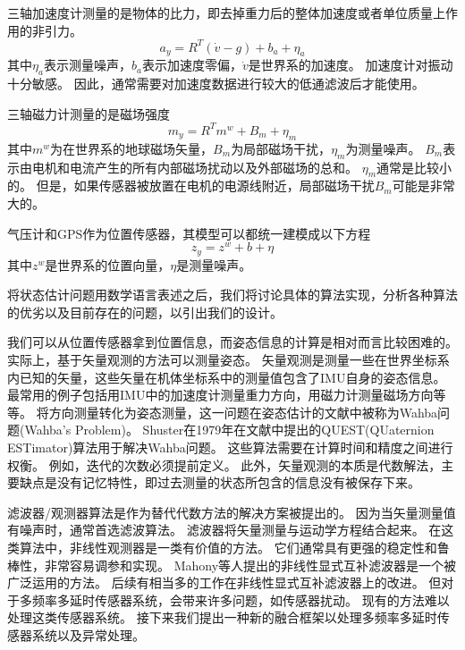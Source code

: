 \documentclass[
  type=master
]{gdutthesis}
\begin{document}
三轴加速度计测量的是物体的比力，即去掉重力后的整体加速度或者单位质量上作用的非引力。
\begin{equation}\label{eq:accmodel}
	a_y=R^T(\dot{v}-g)+b_a+\eta_a
\end{equation}
其中$\eta_a$表示测量噪声，$b_a$表示加速度零偏，$\dot{v}$是世界系的加速度。
加速度计对振动十分敏感。
因此，通常需要对加速度数据进行较大的低通滤波后才能使用。

三轴磁力计测量的是磁场强度
\begin{equation}\label{eq:magmodel}
	m_y=R^T m^w+B_m+\eta_m
\end{equation}
其中$m^w$为在世界系的地球磁场矢量，$B_m$为局部磁场干扰，$\eta_m$为测量噪声。
$B_m$表示由电机和电流产生的所有内部磁场扰动以及外部磁场的总和。
$\eta_m$通常是比较小的。
但是，如果传感器被放置在电机的电源线附近，局部磁场干扰$B_m$可能是非常大的。

气压计和GPS作为位置传感器，其模型可以都统一建模成以下方程
\begin{equation}\label{eq:magmodel}
	z_y=z^w+b+\eta
\end{equation}
其中$z^w$是世界系的位置向量，$\eta$是测量噪声。

将状态估计问题用数学语言表述之后，我们将讨论具体的算法实现，分析各种算法的优劣以及目前存在的问题，以引出我们的设计。

我们可以从位置传感器拿到位置信息，而姿态信息的计算是相对而言比较困难的。
实际上，基于矢量观测的方法可以测量姿态。
矢量观测是测量一些在世界坐标系内已知的矢量，这些矢量在机体坐标系中的测量值包含了IMU自身的姿态信息。
最常用的例子包括用IMU中的加速度计测量重力方向，用磁力计测量磁场方向等等。
将方向测量转化为姿态测量，这一问题在姿态估计的文献中被称为Wahba问题(Wahba's Problem)\cite{wahba1965least}。
Shuster在1979年在文献\cite{shuster1981three}中提出的QUEST(QUaternion ESTimator)算法用于解决Wahba问题。
这些算法需要在计算时间和精度之间进行权衡。
例如，迭代的次数必须提前定义。
此外，矢量观测的本质是代数解法，主要缺点是没有记忆特性，即过去测量的状态所包含的信息没有被保存下来。

滤波器/观测器算法是作为替代代数方法的解决方案被提出的。
因为当矢量测量值有噪声时，通常首选滤波算法。
滤波器将矢量测量与运动学方程结合起来。
在这类算法中，非线性观测器是一类有价值的方法。
它们通常具有更强的稳定性和鲁棒性，非常容易调参和实现。
Mahony等人提出的非线性显式互补滤波器是一个被广泛运用的方法\cite{mahony2008nonlinear}。
后续有相当多的工作在非线性显式互补滤波器上的改进\cite{hua2010attitude,khosravian2016state}。
但对于多频率多延时传感器系统，会带来许多问题，如传感器扰动。
现有的方法难以处理这类传感器系统。
接下来我们提出一种新的融合框架以处理多频率多延时传感器系统以及异常处理。
\end{document}

